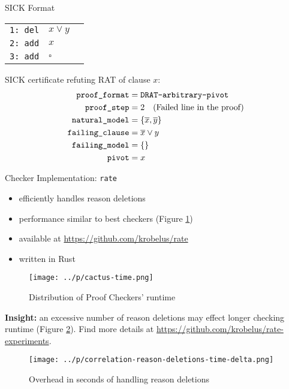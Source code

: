 \documentclass[final,hyperref={pdfpagelabels=true}]{beamer}
\begin{document}
\begin{frame}[fragile]
\begin{columns}[t]
\begin{column}{.45\textwidth}
\begin{block}{SICK Format}
	\begin{tabular}{lll}
    		\texttt{1: del} & $x \lor y$		& \\
    		\texttt{2: add} & $x$			& \\
    		\texttt{3: add} & $\square$		& \\
	\end{tabular}

        \vspace{.5cm}
	SICK certificate refuting RAT of clause $x$:
        \begin{align*}
            \texttt{proof\_format}	&= \texttt{DRAT-arbitrary-pivot}		\\
	    \texttt{proof\_step}	&= 2 \text{\quad (Failed line in the proof)}	\\
	    \texttt{natural\_model}	&= \{\overline{x}, \overline{y}\}		\\
	    \texttt{failing\_clause}	&= \overline{x} \lor y				\\
	    \texttt{failing\_model}	&= \{\}						\\
	    \texttt{pivot}		&= x						
        \end{align*}
    \end{block}
    \begin{block}{Checker Implementation: \texttt{rate}}
        \begin{itemize}
            \item efficiently handles reason deletions
            \item performance similar to best checkers (Figure \ref{fig:cactus-time})
            \item available at \url{https://github.com/krobelus/rate}
            \item written in Rust
        \end{itemize}
    \begin{figure}
        \centering
        \caption{Distribution of Proof Checkers' runtime\label{fig:cactus-time}}
        \texttt{[image: ../p/cactus-time.png]}
    \end{figure}

    \textbf{Insight:} an excessive number of reason
    deletions may effect longer checking runtime (Figure
    \ref{fig:correlation-reason-deletions-time-delta}).  Find more details
    at \url{https://github.com/krobelus/rate-experiments}.

    \vspace{.5cm}

    \begin{figure}
        \centering
        \caption{Overhead in seconds of handling reason deletions\label{fig:correlation-reason-deletions-time-delta}}
        \texttt{[image: ../p/correlation-reason-deletions-time-delta.png]}
    \end{figure}


\end{block}
\end{column}
\end{columns}
\end{frame}
\end{document}
